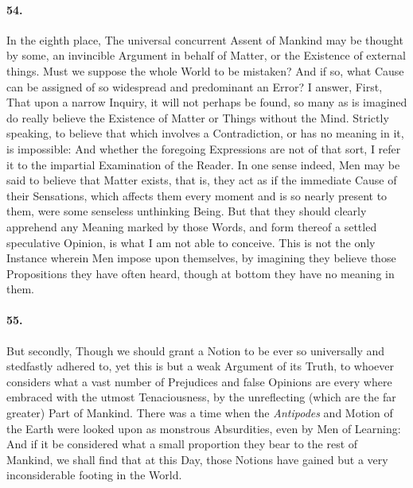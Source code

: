 \documentclass[]{article}
\newenvironment{sectionbody}{\begin{multicols}{2}}{\end{multicols}}
\begin{document}
\begin{sectionbody}
\paragraph{54.} In the eighth place, The universal concurrent Assent of Mankind
may be thought by some, an invincible Argument in behalf of
Matter, or the Existence of external things.  Must we suppose the
whole World to be mistaken? And if so, what Cause can be assigned
of so widespread and predominant an Error? I answer, First, That
upon a narrow Inquiry, it will not perhaps be found, so many as
is imagined do really believe the Existence of Matter or Things
without the Mind.  Strictly speaking, to believe that which
involves a Contradiction, or has no meaning in it, is impossible:
And whether the foregoing Expressions are not of that sort, I
refer it to the impartial Examination of the Reader.  In one
sense indeed, Men may be said to believe that Matter exists, that
is, they act as if the immediate Cause of their Sensations, which
affects them every moment and is so nearly present to them, were
some senseless unthinking Being.  But that they should clearly
apprehend any Meaning marked by those Words, and form thereof a
settled speculative Opinion, is what I am not able to conceive.
This is not the only Instance wherein Men impose upon themselves,
by imagining they believe those Propositions they have often
heard, though at bottom they have no meaning in them.



\paragraph{55.} But secondly, Though we should grant a Notion to be ever so
universally and stedfastly adhered to, yet this is but a weak
Argument of its Truth, to whoever considers what a vast number of
Prejudices and false Opinions are every where embraced with the
utmost Tenaciousness, by the unreflecting (which are the far
greater) Part of Mankind.  There was a time when the
\emph{Antipodes} and Motion of the Earth were looked upon as
monstrous Absurdities, even by Men of Learning: And if it be
considered what a small proportion they bear to the rest of
Mankind, we shall find that at this Day, those Notions have
gained but a very inconsiderable footing in the World.




\end{sectionbody}
\end{document}
